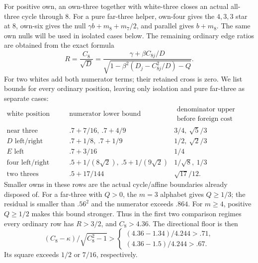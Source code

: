 \documentclass[11pt]{article}
\theoremstyle{definition}
\theoremstyle{remark}
\begin{document}
For positive own, an own-three together with white-three closes an
actual all-three cycle through \(8\). For a pure far-three helper,
own-four gives the \(4,3,3\) star at \(8\), own-six gives the null
\(\gamma b+m_8+m_7/2\), and parallel gives \(b+m_8\).
The same own nulls will be used in isolated cases below.
The remaining ordinary edge ratios are obtained from the exact formula
\[
 R=\frac{C_8}{\sqrt D}
 =\frac{\gamma+\beta C_{8j}/D}
 {\sqrt{1-\beta^2(D_j-C_{8j}^2/D)-Q}}.
\]
For two whites add both numerator terms; their retained cross is zero.
We list bounds for every ordinary position, leaving only isolation
and pure far-three as separate cases:
\[
\begin{array}{c|c|c}
\text{white position}&\text{numerator lower bound}&
 \begin{gathered}\text{denominator upper bound}\\
 \text{before foreign cost}\end{gathered}\\ \hline
\text{near three left/right}&.7+7/16,\ .7+4/9&3/4,\ \sqrt5/3\\
D\text{ left/right}&.7+1/8,\ .7+1/9&1/2,\ \sqrt2/3\\
E\text{ left}&.7+3/16&1/4\\
\text{four left/right}&.5+1/(8\sqrt2),\
 .5+1/(9\sqrt2)&1/\sqrt8,\ 1/3\\
\text{two threes}&.5+17/144&\sqrt{17}/12 .
\end{array}
\]
Smaller owns in these rows are the actual cycle/affine boundaries
already disposed of. For a far-three with \(Q>0\), the
\(m=3\) alphabet gives \(Q\geq1/3\); the residual is smaller
than \(.56^2\) and the numerator exceeds \(.864\).
For \(m\geq4\), positive \(Q\geq1/2\) makes this bound stronger.
Thus in the first two comparison regimes every ordinary row has
\(R>3/2\), and \(C_8>4.36\).
The directional floor is then
\[
 (C_8-\kappa)/\sqrt{C_8^2-1}>
 \begin{cases}(4.36-1.34)/4.244>.71,\\
 (4.36-1.5)/4.244>.67 .
 \end{cases}
\]
Its square exceeds \(1/2\) or \(7/16\), respectively.
\end{document}
